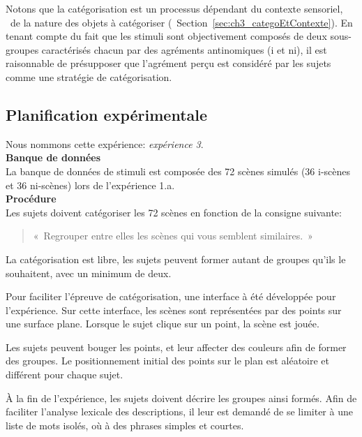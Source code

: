 Notons que la catégorisation est un processus dépendant du contexte sensoriel, \ie~de la nature des objets à catégoriser (\cf~Section~\ref{sec:ch3_categoEtContexte}). En tenant compte du fait que les stimuli sont objectivement composés de deux sous-groupes caractérisés chacun par des agréments antinomiques (i et ni), il est raisonnable de présupposer que l'agrément perçu est considéré par les sujets comme une stratégie de catégorisation.

\subsection{Planification expérimentale}

Nous nommons cette expérience: \emph{expérience 3}. \\

{\setlength{\parindent}{0cm}\textbf{Banque de données}} \\ 

La banque de données de stimuli est composée des 72 scènes simulés (36 i-scènes et 36 ni-scènes) lors de l'expérience 1.a. \\ 

{\setlength{\parindent}{0cm}\textbf{Procédure}} \\

Les sujets doivent catégoriser les 72 scènes en fonction de la consigne suivante:

\begin{quote}
«~Regrouper entre elles les scènes qui vous semblent similaires.~»
\end{quote}

La catégorisation est libre, les sujets peuvent former autant de groupes qu'ils le souhaitent, avec un minimum de deux. 

Pour faciliter l'épreuve de catégorisation, une interface à été développée pour l'expérience. Sur cette interface, les scènes sont représentées par des points sur une surface plane. Lorsque le sujet clique sur un point, la scène est jouée.

Les sujets peuvent bouger les points, et leur affecter des couleurs afin de former des groupes. Le positionnement initial des points sur le plan est aléatoire et différent pour chaque sujet.

À la fin de l'expérience, les sujets doivent décrire les groupes ainsi formés. Afin de faciliter l'analyse lexicale des descriptions, il leur est demandé de se limiter à une liste de mots isolés, où à des phrases simples et courtes.

